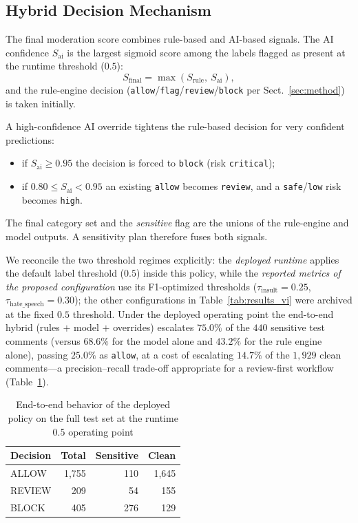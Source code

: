 \documentclass[runningheads]{llncs}
\begin{document}
\subsection{Hybrid Decision Mechanism}

The final moderation score combines rule-based and AI-based signals. The AI confidence $S_{\mathrm{ai}}$ is the largest sigmoid score among the labels flagged as present at the runtime threshold ($0.5$):
\begin{equation}
\label{eq:fusion}
S_{\mathrm{final}} = \max(S_{\mathrm{rule}},\ S_{\mathrm{ai}}),
\end{equation}
and the rule-engine decision (\texttt{allow}/\texttt{flag}/\texttt{review}/\texttt{block} per Sect.~\ref{sec:method}) is taken initially.

A high-confidence AI override tightens the rule-based decision for very confident predictions:
\begin{itemize}[leftmargin=*]
\item if $S_{\mathrm{ai}} \ge 0.95$ the decision is forced to \texttt{block} (risk \texttt{critical});
\item if $0.80 \le S_{\mathrm{ai}} < 0.95$ an existing \texttt{allow} becomes \texttt{review}, and a \texttt{safe}/\texttt{low} risk becomes \texttt{high}.
\end{itemize}

The final category set and the \emph{sensitive} flag are the unions of the rule-engine and model outputs. A sensitivity plan therefore fuses both signals.

We reconcile the two threshold regimes explicitly: the \emph{deployed runtime} applies the default label threshold ($0.5$) inside this policy, while the \emph{reported metrics of the proposed configuration} use its F1-optimized thresholds ($\tau_{\mathrm{insult}}=0.25$, $\tau_{\mathrm{hate\_speech}}=0.30$); the other configurations in Table~\ref{tab:results_vi} were archived at the fixed $0.5$ threshold. Under the deployed operating point the end-to-end hybrid (rules $+$ model $+$ overrides) escalates $75.0\%$ of the $440$ sensitive test comments (versus $68.6\%$ for the model alone and $43.2\%$ for the rule engine alone), passing $25.0\%$ as \texttt{allow}, at a cost of escalating $14.7\%$ of the $1{,}929$ clean comments---a precision--recall trade-off appropriate for a review-first workflow (Table~\ref{tab:fusion}).

\begin{table}
\caption{End-to-end behavior of the deployed policy on the full test set at the runtime $0.5$ operating point}\label{tab:fusion}
\centering
\footnotesize
\begin{tabular}{@{}lrrr@{}}
\hline
\textbf{Decision} & \textbf{Total} & \textbf{Sensitive} & \textbf{Clean} \\
\hline
ALLOW  & 1{,}755 & 110 & 1{,}645 \\
REVIEW &   209  &  54  &  155  \\
BLOCK  &   405  & 276  &  129  \\
\hline
\end{tabular}
\end{table}
\end{document}
